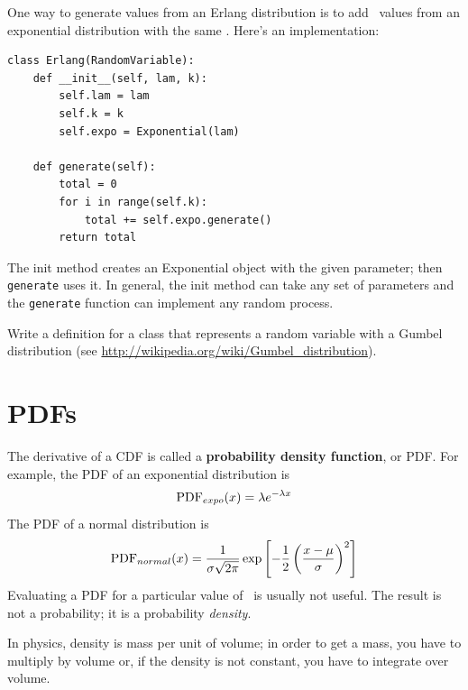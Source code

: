 \documentclass[12pt]{book}
\begin{document}
One way to generate values from an Erlang distribution is to add
\kk~values from an exponential distribution with the same \mylambda.
Here's an implementation:
%
\begin{verbatim}
class Erlang(RandomVariable):
    def __init__(self, lam, k):
        self.lam = lam
        self.k = k
        self.expo = Exponential(lam)

    def generate(self):
        total = 0
        for i in range(self.k):
            total += self.expo.generate()
        return total
\end{verbatim}

The init method creates an Exponential object with the given
parameter; then {\tt generate} uses it.  In general, the init method
can take any set of parameters and the {\tt generate} function can
implement any random process.

\begin{exercise}
Write a definition for a class that represents a random variable
with a Gumbel distribution (see \url{http://wikipedia.org/wiki/Gumbel_distribution}).

\end{exercise}


\section{PDFs}
\label{density}

The derivative of a CDF is called a {\bf probability density function},
or PDF.  For example, the PDF of an exponential distribution is
%
\[ \mathrm{PDF}_{expo}(x) = \lambda e^{-\lambda x}   \]
%
The PDF of a normal distribution is
%
\[ \mathrm{PDF}_{normal}(x) = \frac{1}{\sigma \sqrt{2 \pi}} 
                 \exp \left[ -\frac{1}{2} 
                 \left( \frac{x - \mu}{\sigma} \right)^2 \right]  \]
%
Evaluating a PDF for a particular value of \x~is usually not useful.
The result is not a probability; it is a probability {\em density}.

In physics, density is mass per unit of
volume; in order to get a mass, you have to multiply by volume or,
if the density is not constant, you have to integrate over volume.
\end{document}
